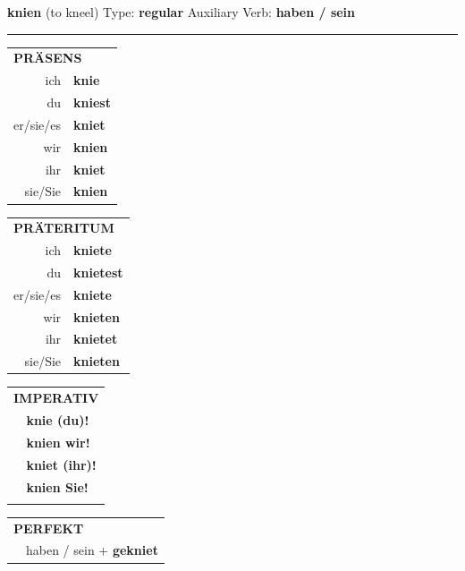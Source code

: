 \documentclass[10pt,a4paper]{revtex4-2}
\begin{document}
\begin{verbbox}
    {\Large \bf  knien} (to kneel) \hfill Type: \textbf{regular} \hfill Auxiliary Verb: \textbf{haben / sein} 
    
     \vspace{5pt}

    \hrule
    
    \vspace{5pt}

  \begin{tabular}{rl}
     \multicolumn{2}{l}{\textbf{PRÄSENS} }\\
    ich & \textbf{knie}\\
    du & \textbf{kniest}\\
    er/sie/es & \textbf{kniet}\\
    wir & \textbf{knien}\\
    ihr & \textbf{kniet}\\
    sie/Sie & \textbf{knien}\\
  \end{tabular}
  \hfill
     \begin{tabular}{rl}
    \multicolumn{2}{l}{\textbf{PRÄTERITUM} }\\
    ich & \textbf{kniete}\\
    du & \textbf{knietest}\\
    er/sie/es & \textbf{kniete}\\
    wir & \textbf{knieten}\\
    ihr & \textbf{knietet}\\
    sie/Sie & \textbf{knieten}\\
  \end{tabular}
  \hfill
  \begin{tabular}{rl}
     \multicolumn{2}{l}{\textbf{IMPERATIV} }\\
   & \textbf{knie (du)!}\\
   & \textbf{knien wir!}\\
   & \textbf{kniet (ihr)!}\\
   & \textbf{knien Sie!}\\
   & \vspace{10pt}
  \end{tabular}

    \vspace{10pt}

 \begin{tabular}{rl}
     \multicolumn{2}{l}{\textbf{PERFEKT}}\\
  &  haben / sein + \textbf{gekniet}\\
  \end{tabular}
\hfill
   \begin{tabular}{rl}
   

\end{tabular}
\end{verbbox}
\end{document}
